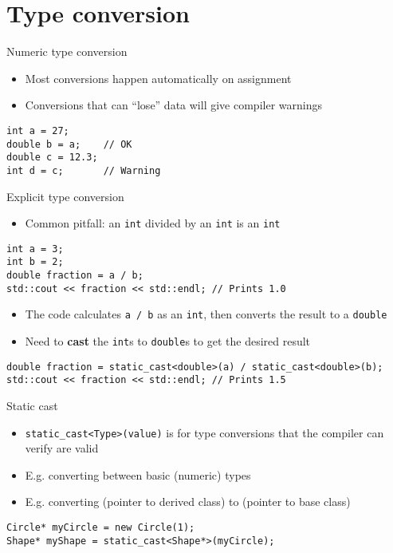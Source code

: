 \part{Type conversion}
\frame{\partpage}

\begin{frame}[fragile]{Numeric type conversion}
    \begin{itemize}
        \item Most conversions happen automatically on assignment \pause
        \item Conversions that can ``lose'' data will give compiler warnings
    \end{itemize}
    \pause
    \begin{lstlisting}
int a = 27;
double b = a;    // OK
double c = 12.3;
int d = c;       // Warning
    \end{lstlisting}
\end{frame}

\begin{frame}[fragile]{Explicit type conversion}
    \begin{itemize}
        \item Common pitfall: an \lstinline{int} divided by an \lstinline{int} is an \lstinline{int}
    \end{itemize}
    \pause
    \begin{lstlisting}
int a = 3;
int b = 2;
double fraction = a / b;
std::cout << fraction << std::endl; // Prints 1.0
    \end{lstlisting}
    \pause
    \begin{itemize}
        \item The code calculates \lstinline{a / b} as an \lstinline{int}, then converts the result to a \lstinline{double} \pause
        \item Need to \textbf{cast} the \lstinline{int}s to \lstinline{double}s to get the desired result
    \end{itemize}
    \pause
    \begin{lstlisting}
double fraction = static_cast<double>(a) / static_cast<double>(b);
std::cout << fraction << std::endl; // Prints 1.5
    \end{lstlisting}
\end{frame}

\begin{frame}[fragile]{Static cast}
    \begin{itemize}
        \item \lstinline{static_cast<Type>(value)} is for type conversions that the compiler can verify are valid \pause
        \item E.g. converting between basic (numeric) types \pause
        \item E.g. converting (pointer to derived class) to (pointer to base class)
    \end{itemize}
    \begin{lstlisting}
Circle* myCircle = new Circle(1);
Shape* myShape = static_cast<Shape*>(myCircle);
    \end{lstlisting}
\end{frame}

